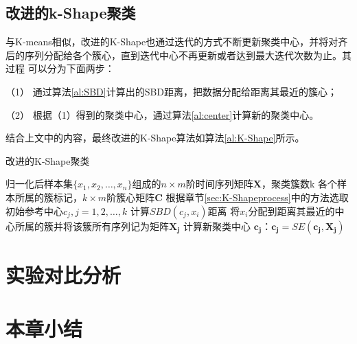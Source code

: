 \subsection{改进的k-Shape聚类}
与K-means相似，改进的K-Shape也通过迭代的方式不断更新聚类中心，并将对齐后的序列分配给各个簇心，直到迭代中心不再更新或者达到最大迭代次数为止。其过程
可以分为下面两步：

（1） 通过算法\ref{al:SBD}计算出的SBD距离，把数据分配给距离其最近的簇心；

（2） 根据（1）得到的聚类中心，通过算法\ref{al:center}计算新的聚类中心。

结合上文中的内容，最终改进的K-Shape算法如算法\ref{al:K-Shape}所示。
\begin{algorithm}
    \caption{改进的K-Shape聚类}
    \begin{algorithmic}[1]
        \Require 归一化后样本集$\{x_1, x_2, \ldots, x_n\}$组成的$n \times m$阶时间序列矩阵$\mathbf{X}$，聚类簇数k
        \Ensure 各个样本所属的簇标记，$k \times m$阶簇心矩阵$\mathbf{C}$
        \State 根据章节\ref{sec:K-Shapeprocess}中的方法选取初始参考中心$c_j,j = 1, 2, \ldots, k$
                    \State 计算$SBD(c_j,x_i)$距离
                \EndFor
                \State 将$x_i$分配到距离其最近的中心所属的簇并将该簇所有序列记为矩阵$\mathbf{X_j}$
            \EndFor
                计算新聚类中心 $\mathbf{c_j}$：$\mathbf{c_j} = SE(\mathbf{c_j}, \mathbf{X_j})$
            \EndFor
        \EndWhile
    \end{algorithmic}
    \label{al:K-Shape}
\end{algorithm}
\section{实验对比分析}
\section{本章小结}